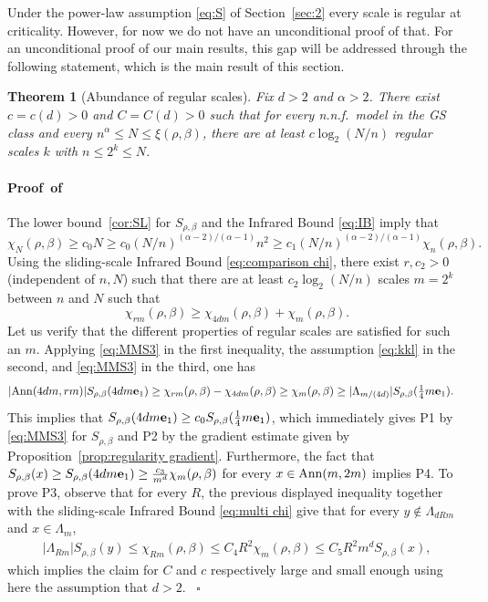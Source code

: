 \documentclass[a4paper,oneside,11pt]{article}
\newtheorem{theorem}{Theorem}[section]
\newcommand{\be}[1]{\begin{equation}\label{#1}}
\newcommand{\ee}{\end{equation}}
\numberwithin{equation}{section}
\numberwithin{equation}{section}
\numberwithin{equation}{section}
\newenvironment{proof}[1][\relax]%
  {\paragraph{Proof\ifx#1\relax\else~of #1\fi}}%
  {~\hfill$\square$\par\bigskip}
\def\be{\begin{equation}}
\def\ee{\end{equation}}
\begin{document}
Under the power-law assumption \eqref{eq:S} of Section~\ref{sec:2} every scale is regular at criticality. However, for now we do not have an unconditional proof of that.   For an unconditional proof of our main results, this gap will be addressed through the following statement, which is the main result of this section. 

 \begin{theorem}[Abundance of regular scales]\label{thm:regular scales}
Fix $d>2$ and $\alpha>2$. There exist $c=c(d)>0$ and $C=C(d)>0$ such that for {every n.n.f.~model in the GS class} and every $n^\alpha\le N\le\xi(\rho,\beta)$, there are at least 
$c\log_2(N/n)$ regular scales $k$ with $n\le 2^k\le N$.
 \end{theorem}

\begin{proof}
The lower bound~\eqref{cor:SL} for $S_{\rho,\beta}$ and the Infrared Bound \eqref{eq:IB} imply that 
\be
\chi_N(\rho,\beta)\ge c_0N\ge c_0(N/n)^{(\alpha-2)/(\alpha-1)}n^2\ge c_1(N/n)^{(\alpha-2)/(\alpha-1)}\chi_n(\rho,\beta).
\ee
Using the sliding-scale Infrared Bound \eqref{eq:comparison chi}, there exist $r,c_2>0$ (independent of $n,N$) such that there are at least $c_2\log_2(N/n)$ scales $m=2^k$ between $n$ and $N$ such that 
\be\label{eq:kkl}
\chi_{rm}(\rho,\beta)\ge \chi_{4dm}(\rho,\beta)+\chi_m(\rho,\beta).
\ee
 Let us verify that the different properties of regular scales are satisfied for such an $m$. 
Applying \eqref{eq:MMS3} in the first inequality,   
the assumption \eqref{eq:kkl} in the second, and \eqref{eq:MMS3} in the third,
one has 
\begin{align}|{\rm Ann}(4dm,rm)|S_{\rho,\beta}(4dm{\bf e}_1)
&\ge \chi_{rm}(\rho,\beta)-\chi_{4dm}(\rho,\beta)\ge \chi_m(\rho,\beta)\ge |\Lambda_{m/(4d)}|S_{\rho,\beta}(\tfrac14m{\bf e}_1).\end{align}
This implies that $S_{\rho,\beta}(4dm{\bf e}_1)\ge c_0S_{\rho,\beta}(\tfrac14m{\bf e}_1)$, which immediately gives P1 by \eqref{eq:MMS3}   for $S_{\rho,\beta}$ and P2 by the gradient estimate given by Proposition~\ref{prop:regularity gradient}.  Furthermore, the fact that $S_{\rho,\beta}(x)\ge S_{\rho,\beta}(4dm{\bf e}_1)\ge \frac{c_3}{m^d}\chi_m(\rho,\beta)$ for every $x\in {\rm Ann}(m,2m)$ implies P4. To prove P3, observe that for every $R$, the previous displayed inequality together with the sliding-scale Infrared Bound \eqref{eq:multi chi} give that for every $y\notin \Lambda_{dRm}$ and $x\in \Lambda_m$,
\begin{align}
|\Lambda_{Rm}|S_{\rho,\beta}(y)\le \chi_{Rm}(\rho,\beta)\le C_4R^{2}\chi_{m}(\rho,\beta)\le C_5R^{2}m^dS_{\rho,\beta}(x), \end{align}
which implies the claim for $C$ and $c$ respectively large and small enough using here the assumption that $d>2$.
\end{proof}
\end{document}
